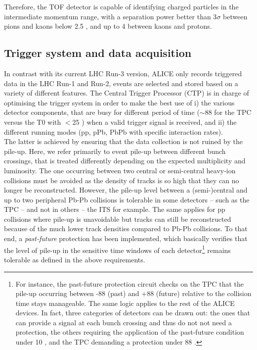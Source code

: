 Therefore, the TOF detector is capable of identifying charged particles in the intermediate momentum range, with a separation power better than 3$\sigma$ between pions and kaons below 2.5 \gmom, and up to 4 \gmom between kaons and protons.

\subsection{Trigger system and data acquisition}
\label{subsec:TriggerSystem}

In contrast with its current LHC Run-3 version, ALICE only records triggered data in the  LHC Run-1 and Run-2, \ie events are selected and stored based on a variety of different features. The Central Trigger Processor (CTP) is in charge of optimising the trigger system in order to make the best use of i) the various detector components, that are busy for different period of time ($\sim$88 \musec for the TPC versus the T0 with $<$25 \nsec) when a valid trigger signal is received, and ii) the different running modes (pp, pPb, PbPb with specific interaction rates).\\

The latter is achieved by ensuring that the data collection is not ruined by the pile-up. Here, we refer primarily to event pile-up between different bunch crossings, that is treated differently depending on the expected multiplicity and luminosity. The one occurring between two central or semi-central heavy-ion collisions must be avoided as the density of tracks is so high that they can no longer be reconstructed. However, the pile-up level between a (semi-)central and up to two peripheral Pb-Pb collisions is tolerable in some detectors -- such as the TPC -- and not in others -- the ITS for example. The same applies for pp collisions where pile-up is unavoidable but tracks can still be reconstructed because of the much lower track densities compared to Pb-Pb collisions. To that end, a \textit{past-future} protection has been implemented, which basically verifies that the level of pile-up in the sensitive time windows of each detector\footnote{For instance, the past-future protection circuit checks on the TPC that the pile-up occurring between -88 \musec (past) and +88 \musec (future) relative to the collision time stays manageable. The same logic applies to the rest of the ALICE devices. In fact, three categories of detectors can be drawn out: the ones that can provide a signal at each bunch crossing and thus do not not need a protection, the others requiring the application of the past-future condition under 10 \musec, and the TPC demanding a protection under 88 \musec.} remains tolerable as defined in the above requirements.\\

